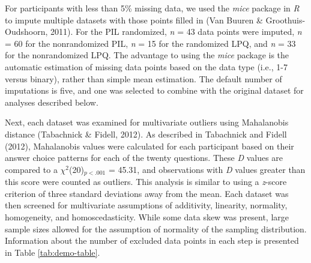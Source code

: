 \documentclass[english,man, mask]{apa6}
\theoremstyle{definition}
\theoremstyle{definition}
\theoremstyle{definition}
\theoremstyle{remark}
\begin{document}
For participants with less than 5\% missing data, we used the
\emph{mice} package in \emph{R} to impute multiple datasets with those
points filled in (Van Buuren \& Groothuis-Oudshoorn, 2011). For the PIL
randomized, \emph{n} = 43 data points were imputed, \emph{n} = 60 for
the nonrandomized PIL, \emph{n} = 15 for the randomized LPQ, and
\emph{n} = 33 for the nonrandomized LPQ. The advantage to using the
\emph{mice} package is the automatic estimation of missing data points
based on the data type (i.e., 1-7 versus binary), rather than simple
mean estimation. The default number of imputations is five, and one was
selected to combine with the original dataset for analyses described
below.

Next, each dataset was examined for multivariate outliers using
Mahalanobis distance (Tabachnick \& Fidell, 2012). As described in
Tabachnick and Fidell (2012), Mahalanobis values were calculated for
each participant based on their answer choice patterns for each of the
twenty questions. These \emph{D} values are compared to a
\(\chi^2\)(20)\(_{p<.001}\) = 45.31, and observations with \emph{D}
values greater than this score were counted as outliers. This analysis
is similar to using a \emph{z}-score criterion of three standard
deviations away from the mean. Each dataset was then screened for
multivariate assumptions of additivity, linearity, normality,
homogeneity, and homoscedasticity. While some data skew was present,
large sample sizes allowed for the assumption of normality of the
sampling distribution. Information about the number of excluded data
points in each step is presented in Table \ref{tab:demo-table}.
\end{document}
